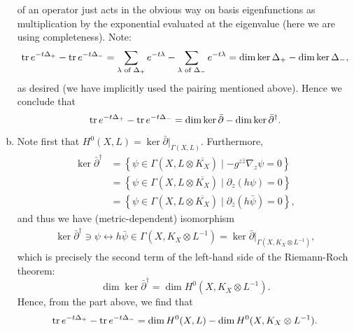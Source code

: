 \documentclass{../mathnotes}
\begin{document}
\begin{enumerate}[(a)]
        of an operator just acts in the obvious way on basis eigenfunctions as multiplication by the exponential evaluated at the eigenvalue (here
        we are using completeness). Note:
        \[\operatorname{tr} e^{-t\Delta_+}-\operatorname{tr} e^{-t\Delta_-}=\sum_{\lambda\text{ of }\Delta_+}e^{-t\lambda}-\sum_{\lambda\text{ of }\Delta_-}e^{-t\lambda}=\dim\ker\Delta_+-\dim\ker\Delta_-,\]
        as desired (we have implicitly used the pairing mentioned above). Hence we conclude that 
        \[\operatorname{tr} e^{-t\Delta_+}-\operatorname{tr} e^{-t\Delta_-}=\dim\ker\bar\partial-\dim\ker\bar\partial^\dagger.\]
    \item Note first that $H^0(X,L)=\ker\bar\partial|_{\Gamma(X,L)}$.
        Furthermore,
        \begin{align*}
            \ker\bar\partial^\dagger&=\left\{ \psi\in\Gamma(X,L\otimes \overline{K_X})\mid-g^{z\bar z}\nabla_z\psi=0 \right\}\\
            &=\left\{ \psi\in\Gamma(X,L\otimes \overline{K_X})\mid\partial_z(h\psi)=0 \right\}\\
            &=\left\{ \psi\in\Gamma(X,L\otimes \overline{K_X})\mid\partial_{\bar z}(h\bar\psi)=0 \right\},
        \end{align*}
        and thus we have (metric-dependent) isomorphism
        \begin{align*}
            \ker\bar\partial^\dagger\ni \psi \longleftrightarrow h\bar\psi\in\Gamma(X,K_X\otimes L^{-1})=\ker\bar\partial|_{\Gamma(X,K_X\otimes L^{-1})},
        \end{align*}
        which is precisely the second term of the left-hand side of the Riemann-Roch theorem:
        \[\dim\ker\bar\partial^\dagger=\dim H^0(X,K_X\otimes L^{-1}).\]
        Hence, from the part above, we find that
        \[\operatorname{tr} e^{-t\Delta_+}-\operatorname{tr} e^{-t\Delta_-}=\dim H^0(X,L)-\dim H^0(X,K_X\otimes L^{-1}).\]
\end{enumerate}
\end{document}
